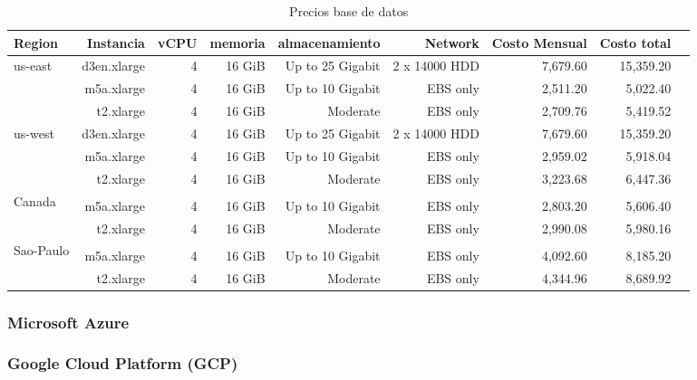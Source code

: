\documentclass{article}
\begin{document}
\begin{table}[!htp]\centering
\caption{Precios base de datos}\label{tab: }
\scriptsize
\begin{tabular}{lrrrrrrrr}\toprule
Region &Instancia &vCPU &memoria &almacenamiento &Network &Costo Mensual &Costo total \\\midrule
\multirow{3}{*}{us-east} &d3en.xlarge &4 &16 GiB &Up to 25 Gigabit &2 x 14000 HDD &7,679.60 &15,359.20 \\
&m5a.xlarge &4 &16 GiB &Up to 10 Gigabit &EBS only &2,511.20 &5,022.40 \\
&t2.xlarge &4 &16 GiB &Moderate &EBS only &2,709.76 &5,419.52 \\
  \midrule
\multirow{3}{*}{us-west} &d3en.xlarge &4 &16 GiB &Up to 25 Gigabit &2 x 14000 HDD &7,679.60 &15,359.20 \\
&m5a.xlarge &4 &16 GiB &Up to 10 Gigabit &EBS only &2,959.02 &5,918.04 \\
&t2.xlarge &4 &16 GiB &Moderate &EBS only &3,223.68 &6,447.36 \\
  \midrule
\multirow{3}{*}{Canada} &\cellcolor[HTML]{A8A8A8} &\cellcolor[HTML]{A8A8A8} &\cellcolor[HTML]{A8A8A8} &\cellcolor[HTML]{A8A8A8} &\cellcolor[HTML]{A8A8A8} &\cellcolor[HTML]{A8A8A8} &\cellcolor[HTML]{A8A8A8} \\
&m5a.xlarge &4 &16 GiB &Up to 10 Gigabit &EBS only &2,803.20 &5,606.40 \\
&t2.xlarge &4 &16 GiB &Moderate &EBS only &2,990.08 &5,980.16 \\
  \midrule
\multirow{3}{*}{Sao-Paulo} &\cellcolor[HTML]{A8A8A8} &\cellcolor[HTML]{A8A8A8} &\cellcolor[HTML]{A8A8A8} &\cellcolor[HTML]{A8A8A8} &\cellcolor[HTML]{A8A8A8} &\cellcolor[HTML]{A8A8A8} &\cellcolor[HTML]{A8A8A8} \\
&m5a.xlarge &4 &16 GiB &Up to 10 Gigabit &EBS only &4,092.60 &8,185.20 \\
&t2.xlarge &4 &16 GiB &Moderate &EBS only &4,344.96 &8,689.92 \\
\bottomrule
\end{tabular}
\end{table}

  
  \subsubsection*{Microsoft Azure}



  \subsubsection*{Google Cloud Platform (GCP)}
\end{document}
